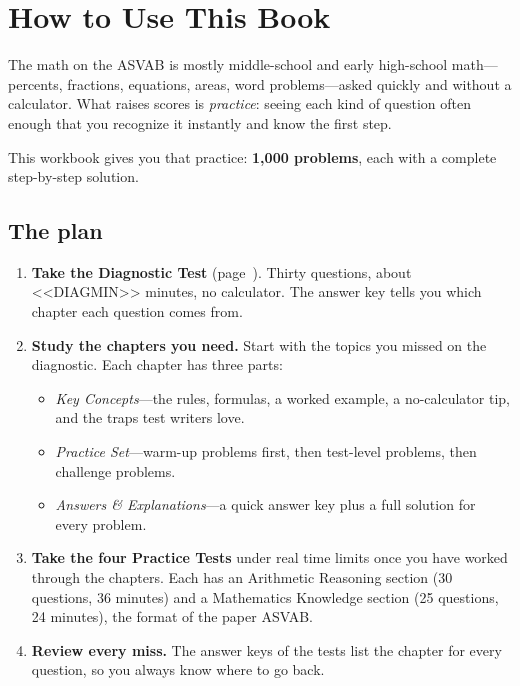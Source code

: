 \tableofcontents
\clearpage

\chapter*{How to Use This Book}

The math on the ASVAB is mostly middle-school and early high-school
math---percents, fractions, equations, areas, word problems---asked quickly
and without a calculator. What raises scores is \emph{practice}: seeing each
kind of question often enough that you recognize it instantly and know the
first step.

This workbook gives you that practice: \textbf{1,000 problems}, each with a
complete step-by-step solution.

\section*{The plan}
\begin{enumerate}[leftmargin=1.6em,itemsep=0.4em]
\item \textbf{Take the Diagnostic Test} (page~\pageref{diag}). Thirty
  questions, about <<DIAGMIN>> minutes, no calculator. The answer key tells you which
  chapter each question comes from.
\item \textbf{Study the chapters you need.} Start with the topics you missed
  on the diagnostic. Each chapter has three parts:
  \begin{itemize}
  \item \emph{Key Concepts}---the rules, formulas, a worked example, a
    no-calculator tip, and the traps test writers love.
  \item \emph{Practice Set}---warm-up problems first, then test-level
    problems, then challenge problems.
  \item \emph{Answers \& Explanations}---a quick answer key plus a full
    solution for every problem.
  \end{itemize}
\item \textbf{Take the four Practice Tests} under real time limits once you
  have worked through the chapters. Each has an Arithmetic Reasoning section
  (30 questions, 36 minutes) and a Mathematics Knowledge section
  (25 questions, 24 minutes), the format of the paper ASVAB.
\item \textbf{Review every miss.} The answer keys of the tests list the
  chapter for every question, so you always know where to go back.
\end{enumerate}

